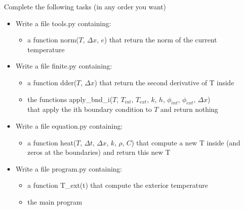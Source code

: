 \documentclass[a4paper,10pt]{article}
\begin{document}
Complete the following tasks (in any order you want)
\begin{itemize}
\item 	Write a file tools.py containing:
\begin{itemize}
\item 	a function norm($T$, $\Delta x$, $e$) that return the norm of the current temperature
\end{itemize}
\item 	Write a file finite.py containing:
\begin{itemize}
\item 	a function dder($T$, $\Delta x$) that return the second derivative of T inside
\item 	the functions apply\_bnd\_i($T$, $T_{int}$, $T_{ext}$, $k$, $h$, $\phi_{int}$, $\phi_{ext}$, $\Delta x$)\\
that apply the ith boundary condition to $T$ and return nothing
\end{itemize}
\item 	Write a file equation.py containing:
\begin{itemize}
\item 	a function heat($T$, $\Delta t$, $\Delta x$, $k$, $\rho$, $C$) that compute a new T inside (and zeros at the boundaries) and return this new T
\end{itemize}
\item 	Write a file program.py containing:
\begin{itemize}
\item       a function T\_ext(t) that compute the exterior temperature
\item 	the main program \\
\end{itemize}
\end{itemize}
\newpage
\end{document}
